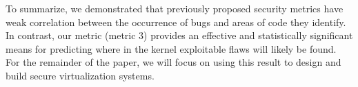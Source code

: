 To summarize, we demonstrated that previously proposed security
metrics have weak correlation between the occurrence of bugs
and areas of code they identify. In contrast, our metric (metric 3)
provides an effective and statistically significant
means for predicting where in the kernel exploitable flaws
will likely be found. For the remainder of the paper, we will
focus on using this result to design and build secure virtualization systems.
